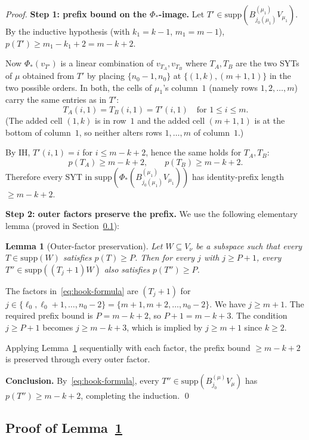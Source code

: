 \documentclass[11pt]{article}
\newtheorem{lemma}[theorem]{Lemma}
\theoremstyle{definition}
\newcommand{\supp}{\mathrm{supp}}
\begin{document}
\begin{proof}
\medskip\textbf{Step 1: prefix bound on the $\Phi_*$-image.}
Let $T' \in \supp(B^{(\mu_1)}_{j_0(\mu_1)} V_{\mu_1})$.  By the
inductive hypothesis (with $k_1 = k - 1$, $m_1 = m - 1$), $p(T') \ge
m_1 - k_1 + 2 = m - k + 2$.

Now $\Phi_*(v_{T'})$ is a linear combination of $v_{T_A}, v_{T_B}$
where $T_A, T_B$ are the two SYTs of $\mu$ obtained from $T'$ by
placing $\{n_0 - 1, n_0\}$ at $\{(1, k), (m + 1, 1)\}$ in the two
possible orders.  In both, the cells of $\mu_1$'s column~$1$
(namely rows $1, 2, \ldots, m$) carry the same entries as in $T'$:
\[
   T_A(i, 1) = T_B(i, 1) = T'(i, 1) \quad \text{for } 1 \le i \le m.
\]
(The added cell $(1, k)$ is in row~$1$ and the added cell $(m+1, 1)$
is at the bottom of column~$1$, so neither alters rows $1, \ldots, m$
of column~$1$.)

By IH, $T'(i, 1) = i$ for $i \le m - k + 2$, hence the same holds
for $T_A, T_B$:
\[
   p(T_A) \ge m - k + 2, \qquad p(T_B) \ge m - k + 2.
\]
Therefore every SYT in $\supp(\Phi_*(B^{(\mu_1)}_{j_0(\mu_1)} V_{\mu_1}))$
has identity-prefix length $\ge m - k + 2$.

\medskip\textbf{Step 2: outer factors preserve the prefix.}
We use the following elementary lemma (proved in
Section~\ref{sec:outer-preserve}):

\begin{lemma}[Outer-factor preservation]\label{lem:outer-preserve}
Let $W \subseteq V_\nu$ be a subspace such that every $T \in \supp(W)$
satisfies $p(T) \ge P$.  Then for every $j$ with $j \ge P + 1$,
every $T'' \in \supp((T_j{+}1) W)$ also satisfies $p(T'') \ge P$.
\end{lemma}

The factors in~\eqref{eq:hook-formula} are $(T_j{+}1)$ for
$j \in \{\ell_0, \ell_0 + 1, \ldots, n_0 - 2\} = \{m + 1, m + 2,
\ldots, n_0 - 2\}$.  We have $j \ge m + 1$.  The required prefix
bound is $P = m - k + 2$, so $P + 1 = m - k + 3$.  The condition
$j \ge P + 1$ becomes $j \ge m - k + 3$, which is implied by
$j \ge m + 1$ since $k \ge 2$.

Applying Lemma~\ref{lem:outer-preserve} sequentially with each
factor, the prefix bound $\ge m - k + 2$ is preserved through every
outer factor.

\medskip\textbf{Conclusion.}  By~\eqref{eq:hook-formula}, every
$T'' \in \supp(B^{(\mu)}_{j_0} V_\mu)$ has $p(T'') \ge m - k + 2$,
completing the induction.
\qed
\end{proof}

\subsection{Proof of Lemma~\ref{lem:outer-preserve}}\label{sec:outer-preserve}
\end{document}
